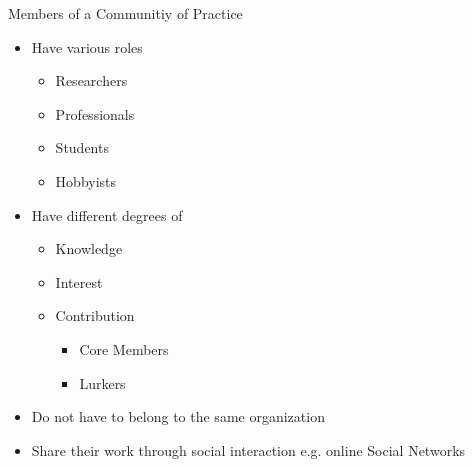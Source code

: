 \begin{frame}{Members of a Communitiy of Practice}
  \begin{itemize}
    \item Have various roles
          \begin{itemize}
            \item Researchers
            \item Professionals
            \item Students
            \item Hobbyists
          \end{itemize} %
    \item Have different degrees of
          \begin{itemize}
            \item Knowledge %
            \item Interest %
            \item Contribution
                  \begin{itemize}
                    \item Core Members %
                    \item Lurkers %
                  \end{itemize}
          \end{itemize}
    \item Do not have to belong to the same organization
    \item Share their work through social interaction e.g. online Social Networks %
  \end{itemize}
\end{frame}


